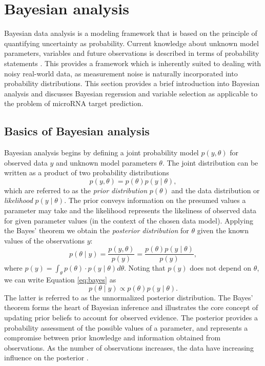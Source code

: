 
\section{Bayesian analysis}\label{bayesian-analysis}

Bayesian data analysis is a modeling framework that is based on the principle
of quantifying uncertainty as probability. Current knowledge about unknown
model parameters, variables and future observations is described in terms of
probability statements \citep{Gelman2013}. This provides a framework which is
inherently suited to dealing with noisy real-world data, as measurement noise
is naturally incorporated into probability distributions. This section
provides a brief introduction into Bayesian analysis and discusses Bayesian
regerssion and variable selection as applicable to the problem of microRNA
target prediction.




\subsection{Basics of Bayesian analysis}

Bayesian analysis begins by defining a joint probability model $p(y,\theta)$
for observed data $y$ and unknown model parameters $\theta$.
The joint distribution can be written as a product of two probability distributions
\begin{equation}
  p(y,\theta) = p(\theta) p(y\mid\theta),
\end{equation}
which are referred to as the \emph{prior distribution} $p(\theta)$ and the
data distribution or \emph{likelihood} $p(y\mid\theta)$. The prior conveys
information on the presumed values a parameter may take and the likelihood
represents the likeliness of observed data for given parameter values (in the
context of the chosen data model). Applying the Bayes' theorem we obtain the
\emph{posterior distribution} for $\theta$ given the known values of the
observations $y$:
\begin{equation}
  \label{eq:bayes}
  p(\theta \mid y) = \frac{p(y,\theta)}{p(y)} = \frac{p(\theta) p(y\mid\theta)}{p(y)},
\end{equation}
where $p(y) = \int_{\theta} p(\theta) \cdot p(y\mid\theta) d\theta$.
Noting that $p(y)$ does not depend on $\theta$, we can write Equation
\eqref{eq:bayes} as
\begin{equation}
  p(\theta \mid y) \propto p(\theta) p(y\mid\theta).
\end{equation}
The latter is referred to as the unnormalized posterior distribution. The
Bayes' theorem forms the heart of Bayesian inference and illustrates the core
concept of updating prior beliefs to account for observed evidence. The
posterior provides a probability assessment of the possible values of
a parameter, and represents a compromise between prior knowledge and information
obtained from observations. As the number of observations increases, the
data have increasing influence on the posterior \citep{Gelman2013}.


